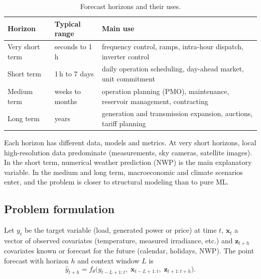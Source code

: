 \documentclass[10pt,a4paper,oneside]{article}
\begin{document}
\begin{table}[h]
\centering
\caption{Forecast horizons and their uses.}
\begin{tabularx}{\textwidth}{l l L}
\toprule
\textbf{Horizon} & \textbf{Typical range} & \textbf{Main use} \\
\midrule
Very short term & seconds to 1\,h & frequency control, ramps, intra-hour
  dispatch, inverter control \\
Short term & 1\,h to 7 days & daily operation scheduling, day-ahead market,
  unit commitment \\
Medium term & weeks to months & operation planning (PMO), maintenance,
  reservoir management, contracting \\
Long term & years & generation and transmission expansion, auctions, tariff
  planning \\
\bottomrule
\end{tabularx}
\end{table}

Each horizon has different data, models and metrics. At very short horizons,
local high-resolution data predominate (measurements, sky cameras, satellite
images). In the short term, numerical weather prediction (NWP) is the main
explanatory variable. In the medium and long term, macroeconomic and climate
scenarios enter, and the problem is closer to structural modeling than to
pure ML.

\subsection{Problem formulation}

Let $y_t$ be the target variable (load, generated power or price) at time
$t$, $\mathbf{x}_t$ a vector of observed covariates (temperature, measured
irradiance, etc.) and $\mathbf{z}_{t+h}$ covariates known or forecast for the
future (calendar, holidays, NWP). The point forecast with horizon $h$ and
context window $L$ is
\begin{equation}
  \hat{y}_{t+h} = f_\theta\big(y_{t-L+1:t},\; \mathbf{x}_{t-L+1:t},\;
  \mathbf{z}_{t+1:t+h}\big).
\end{equation}
\end{document}
